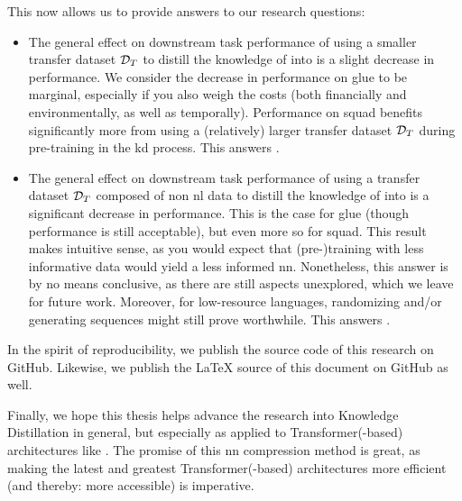 This now allows us to provide answers to our research questions:
\begin{itemize}
    \item The general effect on downstream task performance of using a smaller transfer dataset $\mathcal{D}_T$ to distill the knowledge of \bertbase into \bertstudent is a slight decrease in performance. We consider the decrease in performance on \gls{glue} to be marginal, especially if you also weigh the costs (both financially and environmentally, as well as temporally). Performance on \gls{squad} benefits significantly more from using a (relatively) larger transfer dataset $\mathcal{D}_T$ during pre-training in the \gls{kd} process. This answers .
    \item The general effect on downstream task performance of using a transfer dataset $\mathcal{D}_T$ composed of non \gls{nl} data to distill the knowledge of \bertbase into \bertstudent is a significant decrease in performance. This is the case for \gls{glue} (though performance is still acceptable), but even more so for \gls{squad}. This result makes intuitive sense, as you would expect that (pre-)training with less informative data would yield a less informed \gls{nn}. Nonetheless, this answer is by no means conclusive, as there are still aspects unexplored, which we leave for future work. Moreover, for low-resource languages, randomizing and/or generating sequences might still prove worthwhile. This answers .
\end{itemize}

In the spirit of reproducibility, we publish the source code of this research on GitHub. Likewise, we publish the \LaTeX\xspace source of this document on GitHub as well.

Finally, we hope this thesis helps advance the research into Knowledge Distillation in general, but especially as applied to Transformer(-based) architectures like \bertbase. The promise of this \gls{nn} compression method is great, as making the latest and greatest Transformer(-based) architectures more efficient (and thereby: more accessible) is imperative.
